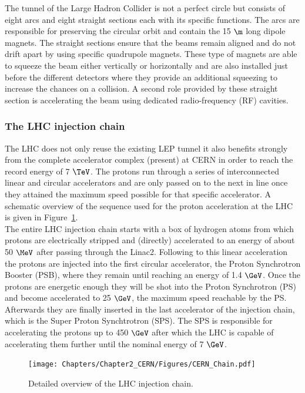The tunnel of the Large Hadron Collider is not a perfect circle but consists of eight arcs and eight straight sections each with its specific functions. 
The arcs are responsible for preserving the circular orbit and contain the 15 $\m$ long dipole magnets.
The straight sections ensure that the beams remain aligned and do not drift apart by using specific quadrupole magnets. These type of magnets are able to squeeze the beam either vertically or horizontally and are also installed just before the different detectors where they provide an additional squeezing to increase the chances on a collision. A second role provided by these straight section is accelerating the beam using dedicated radio-frequency (RF) cavities.

\subsubsection{The LHC injection chain}
The LHC does not only reuse the existing LEP tunnel it also benefits strongly from the complete accelerator complex (present) at CERN in order to reach the record energy of 7 $\TeV$. 
The protons run through a series of interconnected linear and circular accelerators and are only passed on to the next in line once they attained the maximum speed possible for that specific accelerator. A schematic overview of the sequence used for the proton acceleration at the LHC is given in Figure~\ref{fig::LHCChain}.\\
The entire LHC injection chain starts with a box of hydrogen atoms from which protons are electrically stripped and (directly) accelerated to an energy of about 50 $\MeV$ after passing through the Linac2.
Following to this linear acceleration the protons are injected into the first circular accelerator, the Proton Synchrotron Booster (PSB), where they remain until reaching an energy of 1.4 $\GeV$.
Once the protons are energetic enough they will be shot into the Proton Synchrotron (PS) and become accelerated to 25 $\GeV$, the maximum speed reachable by the PS.
Afterwards they are finally inserted in the last accelerator of the injection chain, which is the Super Proton Synchtrotron (SPS).
The SPS is responsible for accelerating the protons up to 450 $\GeV$ after which the LHC is capable of accelerating them further until the nominal energy of 7 $\GeV$.
\begin{figure}[h!t]
 \centering
 \texttt{[image: Chapters/Chapter2\_CERN/Figures/CERN\_Chain.pdf]}
 \caption{Detailed overview of the LHC injection chain.} \label{fig::LHCChain}
\end{figure}

